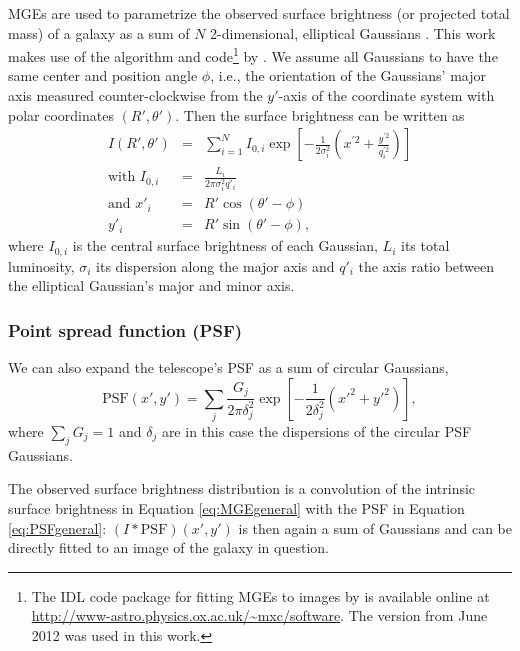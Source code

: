 \documentclass[useAMS,usenatbib]{mnras}
\begin{document}
MGEs are used to parametrize the observed surface brightness (or projected total mass) of a galaxy as a sum of $N$ 2-dimensional, elliptical Gaussians \citep{1991ApJ...366..599B,1992A&A...253..366M,1994A&A...285..723E,1999MNRAS.303..495E}. This work makes use of the algorithm and code\footnote{The IDL code package for fitting MGEs to images by \citet{Cap02} is available online at \url{http://www-astro.physics.ox.ac.uk/~mxc/software}. The version from June 2012 was used in this work.} by \citet{Cap02}. We assume all Gaussians to have the same center and position angle $\phi$, i.e., the orientation of the Gaussians' major axis measured counter-clockwise from the $y'$-axis of the coordinate system with polar coordinates $(R',\theta')$. Then the surface brightness can be written as
\begin{eqnarray}
I(R',\theta') &=& \sum_{i=1}^{N} I_{0,i} \exp\left[ - \frac{1}{2\sigma_i^2} \left(x^{'2} + \frac{y^{'2}}{q_i^{'2}}\right)\right]\label{eq:MGEgeneral}\\
\text{with } I_{0,i} &=& \frac{L_i}{2\pi \sigma_i^2 q'_i}\label{eq:centralItotalL}\\
\text{and } x'_i &=& R' \cos(\theta' - \phi)\nonumber\\
y'_i &=& R' \sin(\theta' - \phi),\nonumber
\end{eqnarray}
where $I_{0,i}$ is the central surface brightness of each Gaussian, $L_i$ its total luminosity, $\sigma_i$ its dispersion along the major axis and $q'_i$ the axis ratio between the elliptical Gaussian's major and minor axis.

\subsubsection{Point spread function (PSF)}

We can also expand the telescope's PSF as a sum of circular Gaussians,
\begin{equation}
\text{PSF}(x',y') = \sum_j \frac{G_j}{2 \pi \delta_j^2} \exp\left[- \frac{1}{2 \delta_j^2} \left({x'}^2 + {y'}^2 \right)\right], \label{eq:PSFgeneral}
\end{equation}
where $\sum_j G_j = 1$ and $\delta_j$ are in this case the dispersions of the circular PSF Gaussians. 

The observed surface brightness distribution is a convolution of the intrinsic surface brightness in Equation \eqref{eq:MGEgeneral} with the PSF in Equation \eqref{eq:PSFgeneral}: $(I \ast \text{PSF}) (x',y')$ is then again a sum of Gaussians and can be directly fitted to an image of the galaxy in question.
\end{document}
